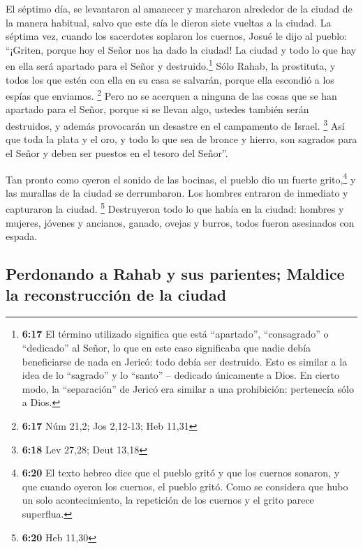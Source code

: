  El séptimo día, se levantaron al amanecer y marcharon
alrededor de la ciudad de la manera habitual, salvo que este día le
dieron siete vueltas a la ciudad.  La séptima vez, cuando
los sacerdotes soplaron los cuernos, Josué le dijo al pueblo: ``¡Griten,
porque hoy el Señor nos ha dado la ciudad!  La ciudad y
todo lo que hay en ella será apartado para el Señor y
destruido.\footnote{\textbf{6:17} El término utilizado significa que
  está ``apartado'', ``consagrado'' o ``dedicado'' al Señor, lo que en
  este caso significaba que nadie debía beneficiarse de nada en Jericó:
  todo debía ser destruido. Esto es similar a la idea de lo ``sagrado''
  y lo ``santo'' -- dedicado únicamente a Dios. En cierto modo, la
  ``separación'' de Jericó era similar a una prohibición: pertenecía
  sólo a Dios.} Sólo Rahab, la prostituta, y todos los que estén con
ella en su casa se salvarán, porque ella escondió a los espías que
enviamos. \footnote{\textbf{6:17} Núm 21,2; Jos 2,12-13; Heb 11,31}
 Pero no se acerquen a ninguna de las cosas que se han
apartado para el Señor, porque si se llevan algo, ustedes también serán
destruidos, y además provocarán un desastre en el campamento de Israel.
\footnote{\textbf{6:18} Lev 27,28; Deut 13,18}  Así que
toda la plata y el oro, y todo lo que sea de bronce y hierro, son
sagrados para el Señor y deben ser puestos en el tesoro del Señor''.

 Tan pronto como oyeron el sonido de las bocinas, el
pueblo dio un fuerte grito,\footnote{\textbf{6:20} El texto hebreo dice
  que el pueblo gritó y que los cuernos sonaron, y que cuando oyeron los
  cuernos, el pueblo gritó. Como se considera que hubo un solo
  acontecimiento, la repetición de los cuernos y el grito parece
  superflua.} y las murallas de la ciudad se derrumbaron. Los hombres
entraron de inmediato y capturaron la ciudad. \footnote{\textbf{6:20}
  Heb 11,30}  Destruyeron todo lo que había en la ciudad:
hombres y mujeres, jóvenes y ancianos, ganado, ovejas y burros, todos
fueron asesinados con espada.

\hypertarget{perdonando-a-rahab-y-sus-parientes-maldice-la-reconstrucciuxf3n-de-la-ciudad}{%
\subsection{Perdonando a Rahab y sus parientes; Maldice la
reconstrucción de la
ciudad}\label{perdonando-a-rahab-y-sus-parientes-maldice-la-reconstrucciuxf3n-de-la-ciudad}}

